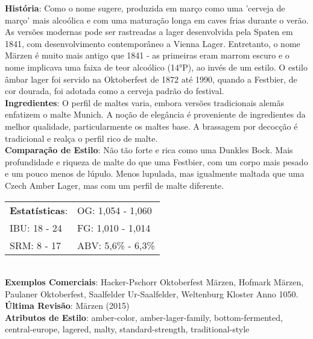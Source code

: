 \textbf{História}: Como o nome sugere, produzida em março como uma 'cerveja de março' mais alcoólica e com uma maturação longa em caves frias durante o verão. As versões modernas pode ser rastreadas a lager desenvolvida pela Spaten em 1841, com desenvolvimento contemporâneo a Vienna Lager. Entretanto, o nome Märzen é muito mais antigo que 1841 - as primeiras eram marrom escuro e o nome implicava uma faixa de teor alcoólico (14°P), ao invés de um estilo. O estilo âmbar lager foi servido na Oktoberfest de 1872 até 1990, quando a Festbier, de cor dourada, foi adotada como a cerveja padrão do festival. \\
\textbf{Ingredientes}: O perfil de maltes varia, embora versões tradicionais alemãs enfatizem o malte Munich. A noção de elegância é proveniente de ingredientes da melhor qualidade, particularmente os maltes base. A brassagem por decocção é tradicional e realça o perfil rico de malte. \\
\textbf{Comparação de Estilo}: Não tão forte e rica como uma Dunkles Bock. Mais profundidade e riqueza de malte do que uma Festbier, com um corpo mais pesado e um pouco menos de lúpulo. Menos lupulada, mas igualmente maltada que uma Czech Amber Lager, mas com um perfil de malte diferente. \\
\begin{tabular}{@{}p{35mm}p{35mm}@{}}
  \textbf{Estatísticas}: & OG: 1,054 - 1,060 \\
  IBU: 18 - 24  & FG: 1,010 - 1,014  \\
  SRM: 8 - 17  & ABV: 5,6\% - 6,3\%
\end{tabular}\\
\textbf{Exemplos Comerciais}: Hacker-Pschorr Oktoberfest Märzen, Hofmark Märzen, Paulaner Oktoberfest, Saalfelder Ur-Saalfelder, Weltenburg Kloster Anno 1050. \\
\textbf{Última Revisão}: Märzen (2015) \\
\textbf{Atributos de Estilo}: amber-color, amber-lager-family, bottom-fermented, central-europe, lagered, malty, standard-strength, traditional-style
